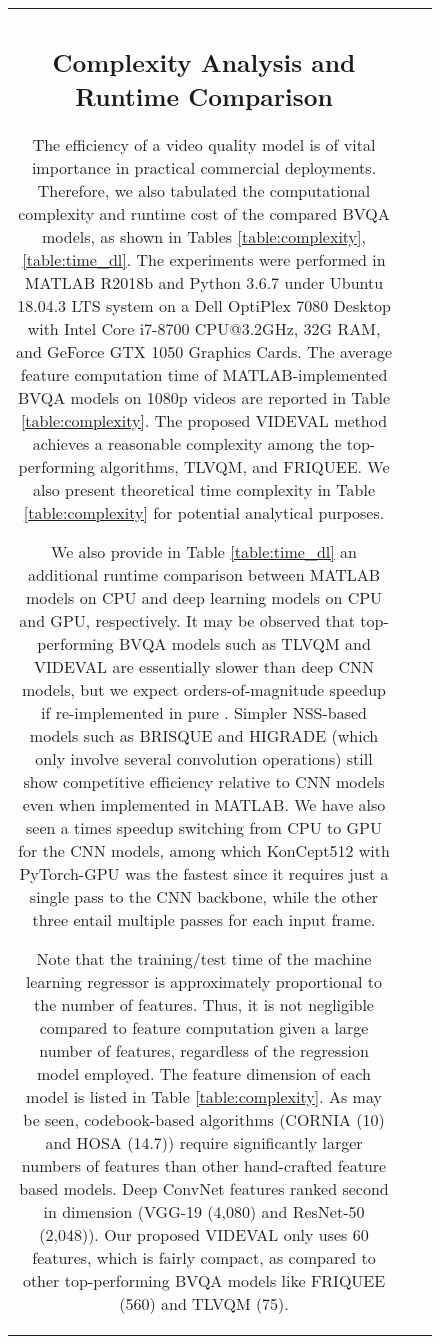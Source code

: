 \documentclass[journal]{IEEEtran}
\begin{document}
\begin{figure}[!t]
\begin{tabular}{ccc}
\subsection{Complexity Analysis and Runtime Comparison}

The efficiency of a video quality model is of vital importance in practical commercial deployments. Therefore, we also tabulated the computational complexity and runtime cost of the compared BVQA models, as shown in Tables \ref{table:complexity}, \ref{table:time_dl}. The experiments were performed in MATLAB R2018b and Python 3.6.7 under Ubuntu 18.04.3 LTS system on a Dell OptiPlex 7080 Desktop with Intel Core i7-8700 CPU@3.2GHz, 32G RAM, and GeForce GTX 1050 Graphics Cards. The average feature computation time of MATLAB-implemented BVQA models on 1080p videos are reported in Table \ref{table:complexity}. The proposed VIDEVAL method achieves a reasonable complexity among the top-performing algorithms, TLVQM, and FRIQUEE. We also present theoretical time complexity in Table \ref{table:complexity} for potential analytical purposes.

{We also provide in Table \ref{table:time_dl} an additional runtime comparison between MATLAB models on CPU and deep learning models on CPU and GPU, respectively. It may be observed that top-performing BVQA models such as TLVQM and VIDEVAL are essentially slower than deep CNN models, but we expect orders-of-magnitude speedup if re-implemented in pure . Simpler NSS-based models such as BRISQUE and HIGRADE (which only involve several convolution operations) still show competitive efficiency relative to CNN models even when implemented in MATLAB. We have also seen a  times speedup switching from CPU to GPU for the CNN models, among which KonCept512 with PyTorch-GPU was the fastest since it requires just a single pass to the CNN backbone, while the other three entail multiple passes for each input frame.}

Note that the training/test time of the machine learning regressor is approximately proportional to the number of features. Thus, it is not negligible compared to feature computation given a large number of features, regardless of the regression model employed. The feature dimension of each model is listed in Table \ref{table:complexity}. As may be seen, codebook-based algorithms (CORNIA (10) and HOSA (14.7)) require significantly larger numbers of features than other hand-crafted feature based models. Deep ConvNet features ranked second in dimension (VGG-19 (4,080) and ResNet-50 (2,048)). Our proposed VIDEVAL only uses 60 features, which is fairly compact, as compared to other top-performing BVQA models like FRIQUEE (560) and TLVQM (75).


\end{tabular}
\end{figure}
\end{document}
